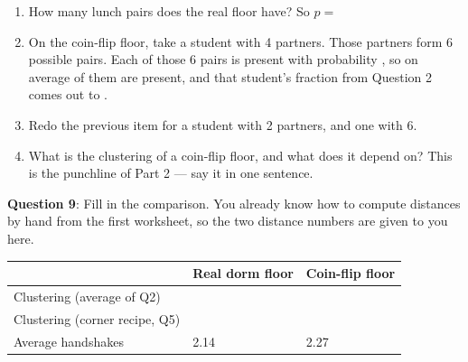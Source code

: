 \documentclass[a4paper, 14pt]{extarticle}
\begin{document}
\begin{enumerate}
    \item How many lunch pairs does the real floor have?
          \underline{\hspace{2cm}} \quad So $p = $ \underline{\hspace{2cm}}
    \item On the coin-flip floor, take a student with 4 partners. Those partners
          form 6 possible pairs. Each of those 6 pairs is present with
          probability \underline{\hspace{2cm}}, so on average
          \underline{\hspace{2cm}} of them are present, and that student's
          fraction from Question 2 comes out to \underline{\hspace{2cm}}.
    \item Redo the previous item for a student with 2 partners, and one with 6.

    \underline{\hspace{\textwidth}}

    \item What is the clustering of a coin-flip floor, and what does it depend
          on? This is the punchline of Part 2 --- say it in one sentence.

    \underline{\hspace{\textwidth}}
\end{enumerate}

\clearpage

{\bf Question 9}:
Fill in the comparison. You already know how to compute distances by hand from
the first worksheet, so the two distance numbers are given to you here.

\begin{center}
\begin{tabular}{|l|p{3.2cm}|p{3.2cm}|}
\hline
 & Real dorm floor & Coin-flip floor \\
\hline
Clustering (average of Q2) & & \\[0.5cm]
\hline
Clustering (corner recipe, Q5) & & \\[0.5cm]
\hline
Average handshakes & 2.14 & 2.27 \\[0.5cm]
\hline
\end{tabular}
\end{center}
\end{document}
